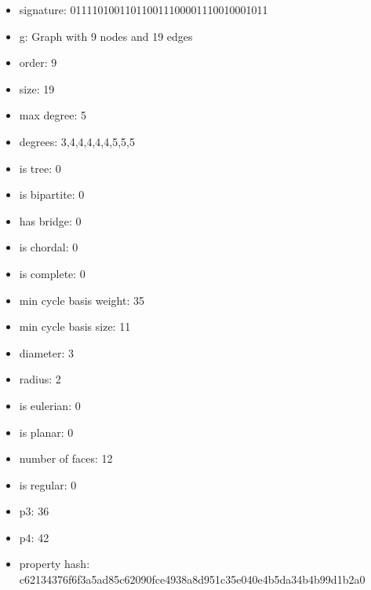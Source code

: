 \newpage
\begin{figure}
\end{figure}
\begin{itemize}
\item signature: 011110100110110011100001110010001011
\item g: Graph with 9 nodes and 19 edges
\item order: 9
\item size: 19
\item max degree: 5
\item degrees: 3,4,4,4,4,4,5,5,5
\item is tree: 0
\item is bipartite: 0
\item has bridge: 0
\item is chordal: 0
\item is complete: 0
\item min cycle basis weight: 35
\item min cycle basis size: 11
\item diameter: 3
\item radius: 2
\item is eulerian: 0
\item is planar: 0
\item number of faces: 12
\item is regular: 0
\item p3: 36
\item p4: 42
\item property hash: c62134376f6f3a5ad85c62090fce4938a8d951c35e040e4b5da34b4b99d1b2a0
\end{itemize}
